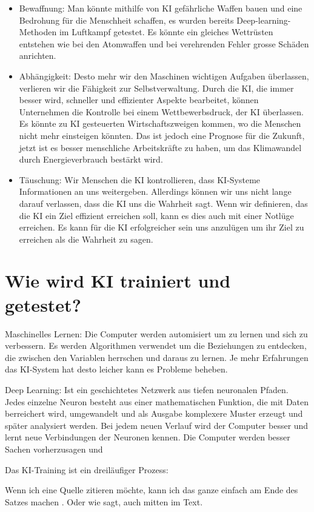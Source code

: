 \documentclass{report}
\begin{document}
\begin{itemize}
    \item Bewaffnung: Man könnte mithilfe von KI gefährliche Waffen bauen und eine Bedrohung für die Menschheit schaffen, es wurden bereits Deep-learning-Methoden im Luftkampf getestet. Es könnte ein gleiches Wettrüsten entstehen wie bei den Atomwaffen und bei verehrenden Fehler grosse Schäden anrichten.
    \item Abhängigkeit: Desto mehr wir den Maschinen wichtigen Aufgaben überlassen, verlieren wir die Fähigkeit zur Selbstverwaltung. Durch die KI, die immer besser wird, schneller und effizienter Aspekte bearbeitet, können Unternehmen die Kontrolle bei einem Wettbewerbsdruck, der KI überlassen. Es könnte zu KI gesteuerten Wirtschaftszweigen kommen, wo die Menschen nicht mehr einsteigen könnten. Das ist jedoch eine Prognose für die Zukunft, jetzt ist es besser menschliche Arbeitskräfte zu haben, um das Klimawandel durch Energieverbrauch bestärkt wird.
    \item Täuschung: Wir Menschen die KI kontrollieren, dass KI-Systeme Informationen an uns weitergeben. Allerdings können wir uns nicht lange darauf verlassen, dass die KI uns die Wahrheit sagt. Wenn wir definieren, das die KI ein Ziel effizient erreichen soll, kann es dies auch mit einer Notlüge erreichen. Es kann für die KI erfolgreicher sein uns anzulügen um ihr Ziel zu erreichen als die Wahrheit zu sagen. 
\end{itemize}




\section{Wie wird KI trainiert und getestet?}

Maschinelles Lernen:
Die Computer werden automisiert um zu lernen und sich zu verbessern. Es werden Algorithmen verwendet um die Beziehungen zu entdecken, die zwischen den Variablen herrschen und daraus zu lernen. Je mehr Erfahrungen das KI-System hat desto leicher kann es Probleme beheben.

Deep Learning:
Ist ein geschichtetes Netzwerk aus tiefen neuronalen Pfaden. Jedes einzelne Neuron besteht aus einer mathematischen Funktion, die mit Daten berreichert wird, umgewandelt und als Ausgabe komplexere Muster erzeugt und später  analysiert werden.
Bei jedem neuen Verlauf wird der Computer besser und lernt neue Verbindungen der Neuronen kennen. Die Computer werden besser Sachen vorherzusagen und   
 
Das KI-Training ist ein dreiläufiger Prozess:

 

Wenn ich eine Quelle zitieren möchte, kann ich das ganze einfach am Ende des Satzes machen \citep{example}. Oder wie \citet{example} sagt, auch mitten im Text.

\printbibliography
\end{document}
